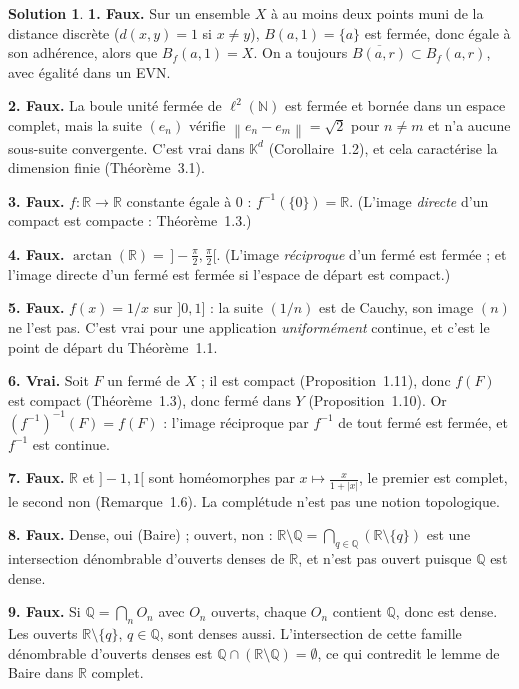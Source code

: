 \documentclass[11pt,a4paper]{article}
\newcommand{\R}{\mathbb{R}}
\newcommand{\N}{\mathbb{N}}
\newcommand{\Q}{\mathbb{Q}}
\newcommand{\K}{\mathbb{K}}
\newcommand{\adh}[1]{\overline{#1}}
\newcommand{\Bf}{B_f}
\newcommand{\norm}[1]{\left\|#1\right\|}
\theoremstyle{definition}
\newtheorem*{solution}{Solution}
\begin{document}
\begin{solution}
\noindent\textbf{1. Faux.} Sur un ensemble $X$ à au moins deux points muni de la distance discrète ($d(x,y)=1$ si $x\ne y$), $B(a,1)=\{a\}$ est fermée, donc égale à son adhérence, alors que $\Bf(a,1)=X$. On a toujours $\adh{B(a,r)}\subset\Bf(a,r)$, avec égalité dans un EVN.

\medskip
\noindent\textbf{2. Faux.} La boule unité fermée de $\ell^2(\N)$ est fermée et bornée dans un espace complet, mais la suite $(e_n)$ vérifie $\norm{e_n-e_m}=\sqrt2$ pour $n\ne m$ et n'a aucune sous-suite convergente. C'est vrai dans $\K^d$ (Corollaire~1.2), et cela caractérise la dimension finie (Théorème~3.1).

\medskip
\noindent\textbf{3. Faux.} $f:\R\to\R$ constante égale à $0$ : $f^{-1}(\{0\})=\R$. (L'image \emph{directe} d'un compact est compacte : Théorème~1.3.)

\medskip
\noindent\textbf{4. Faux.} $\arctan(\R)=\,]-\frac\pi2,\frac\pi2[$. (L'image \emph{réciproque} d'un fermé est fermée ; et l'image directe d'un fermé est fermée si l'espace de départ est compact.)

\medskip
\noindent\textbf{5. Faux.} $f(x)=1/x$ sur $]0,1]$ : la suite $(1/n)$ est de Cauchy, son image $(n)$ ne l'est pas. C'est vrai pour une application \emph{uniformément} continue, et c'est le point de départ du Théorème~1.1.

\medskip
\noindent\textbf{6. Vrai.} Soit $F$ un fermé de $X$ ; il est compact (Proposition~1.11), donc $f(F)$ est compact (Théorème~1.3), donc fermé dans $Y$ (Proposition~1.10). Or $(f^{-1})^{-1}(F)=f(F)$ : l'image réciproque par $f^{-1}$ de tout fermé est fermée, et $f^{-1}$ est continue.

\medskip
\noindent\textbf{7. Faux.} $\R$ et $]-1,1[$ sont homéomorphes par $x\mapsto\frac x{1+|x|}$, le premier est complet, le second non (Remarque~1.6). La complétude n'est pas une notion topologique.

\medskip
\noindent\textbf{8. Faux.} Dense, oui (Baire) ; ouvert, non : $\R\setminus\Q=\bigcap_{q\in\Q}(\R\setminus\{q\})$ est une intersection dénombrable d'ouverts denses de $\R$, et n'est pas ouvert puisque $\Q$ est dense.

\medskip
\noindent\textbf{9. Faux.} Si $\Q=\bigcap_nO_n$ avec $O_n$ ouverts, chaque $O_n$ contient $\Q$, donc est dense. Les ouverts $\R\setminus\{q\}$, $q\in\Q$, sont denses aussi. L'intersection de cette famille dénombrable d'ouverts denses est $\Q\cap(\R\setminus\Q)=\emptyset$, ce qui contredit le lemme de Baire dans $\R$ complet.


\end{solution}
\end{document}
